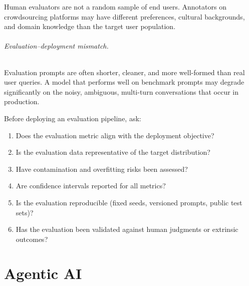 Human evaluators are not a random sample of end users. Annotators on crowdsourcing platforms may have different preferences, cultural backgrounds, and domain knowledge than the target user population.

\paragraph{Evaluation--deployment mismatch.}
\label{evaluationdeployment-mismatch.}

Evaluation prompts are often shorter, cleaner, and more well-formed than real user queries. A model that performs well on benchmark prompts may degrade significantly on the noisy, ambiguous, multi-turn conversations that occur in production.

\begin{questionbox}
Before deploying an evaluation pipeline, ask:

\begin{enumerate}
  \item Does the evaluation metric align with the deployment objective?
  \item Is the evaluation data representative of the target distribution?
  \item Have contamination and overfitting risks been assessed?
  \item Are confidence intervals reported for all metrics?
  \item Is the evaluation reproducible (fixed seeds, versioned prompts, public test sets)?
  \item Has the evaluation been validated against human judgments or extrinsic outcomes?
\end{enumerate}
\end{questionbox}

\part{Agentic AI}

